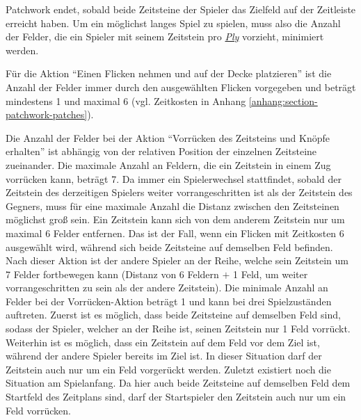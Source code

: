 Patchwork endet, sobald beide Zeitsteine der Spieler das Zielfeld auf der Zeitleiste erreicht haben. Um ein möglichst langes Spiel zu spielen, muss also die Anzahl der Felder, die ein Spieler mit seinem Zeitstein pro \hyperref[text:ply]{\emph{Ply}} vorzieht, minimiert werden.

Für die Aktion \enquote{Einen Flicken nehmen und auf der Decke platzieren} ist die Anzahl der Felder immer durch den ausgewählten Flicken vorgegeben und beträgt mindestens 1 und maximal 6 (vgl. Zeitkosten in Anhang \ref{anhang:section-patchwork-patches}).

\pagebreak

Die Anzahl der Felder bei der Aktion \enquote{Vorrücken des Zeitsteins und Knöpfe erhalten} ist abhängig von der relativen Position der einzelnen Zeitsteine zueinander. Die maximale Anzahl an Feldern, die ein Zeitstein in einem Zug vorrücken kann, beträgt 7. Da immer ein Spielerwechsel stattfindet, sobald der Zeitstein des derzeitigen Spielers weiter vorrangeschritten ist als der Zeitstein des Gegners, muss für eine maximale Anzahl die Distanz zwischen den Zeitsteinen möglichst groß sein. Ein Zeitstein kann sich von dem anderem Zeitstein nur um maximal 6 Felder entfernen. Das ist der Fall, wenn ein Flicken mit Zeitkosten 6 ausgewählt wird, während sich beide Zeitsteine auf demselben Feld befinden. Nach dieser Aktion ist der andere Spieler an der Reihe, welche sein Zeitstein um 7 Felder fortbewegen kann (Distanz von 6 Feldern $+$ 1 Feld, um weiter vorrangeschritten zu sein als der andere Zeitstein). Die minimale Anzahl an Felder bei der Vorrücken-Aktion beträgt 1 und kann bei drei Spielzuständen auftreten. Zuerst ist es möglich, dass beide Zeitsteine auf demselben Feld sind, sodass der Spieler, welcher an der Reihe ist, seinen Zeitstein nur 1 Feld vorrückt. Weiterhin ist es möglich, dass ein Zeitstein auf dem Feld vor dem Ziel ist, während der andere Spieler bereits im Ziel ist. In dieser Situation darf der Zeitstein auch nur um ein Feld vorgerückt werden. Zuletzt existiert noch die Situation am Spielanfang. Da hier auch beide Zeitsteine auf demselben Feld \textemdash{} dem Startfeld des Zeitplans \textemdash{} sind, darf der Startspieler den Zeitstein auch nur um ein Feld vorrücken.

